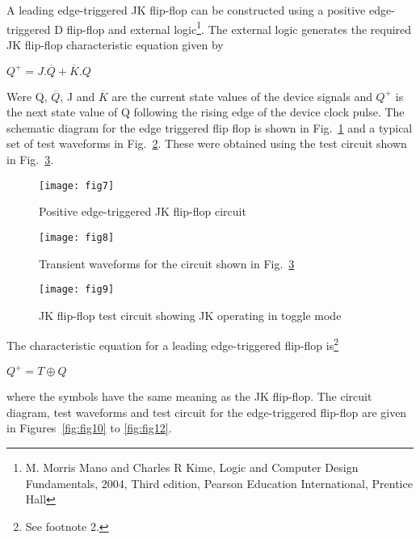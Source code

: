 A leading edge-triggered JK flip-flop can be constructed using a
positive edge-triggered D flip-flop and external
logic\footnote{M. Morris Mano and Charles R Kime, Logic and Computer
Design Fundamentals, 2004, Third edition, Pearson Education
International, Prentice Hall}. The external logic generates the
required JK flip-flop characteristic equation given by
\begin{center}
\begin{large}$Q^{+}=J.\overline{Q}+\overline{K}.Q$
\end{large}\end{center}
Were Q, $\overline{Q}$, J and $\overline{K}$ are the current state
values of the device signals and $Q^{+}$ is the next state value of Q
following the rising edge of the device clock pulse.  The schematic
diagram for the edge triggered flip flop is shown in
Fig.~\ref{fig:fig7} and a typical set of test waveforms in
Fig.~\ref{fig:fig8}. These were obtained using the test circuit shown
in Fig.~\ref{fig:fig9}.

\begin{figure}[ht]
  \centering
	\texttt{[image: fig7]}
        \caption{Positive edge-triggered JK flip-flop circuit}
        \label{fig:fig7}
\end{figure} 

\begin{figure}[ht]
  \centering
  \texttt{[image: fig8]}
  \caption{Transient waveforms for the circuit shown in Fig.~\ref{fig:fig9}}
  \label{fig:fig8}
\end{figure}

\begin{figure}[ht]
  \centering
  \texttt{[image: fig9]}
  \caption{JK flip-flop test circuit showing JK operating in toggle mode}
  \label{fig:fig9}
\end{figure}

\FloatBarrier


The characteristic equation for a leading edge-triggered flip-flop
is\footnote{See footnote 2.}
\begin{center}
\begin{large}$Q^{+}=T \oplus Q$
\end{large}\end{center}
where the symbols have the same meaning as the JK flip-flop.  The
circuit diagram, test waveforms and test circuit for the
edge-triggered flip-flop are given in Figures~\ref{fig:fig10} to
\ref{fig:fig12}.

